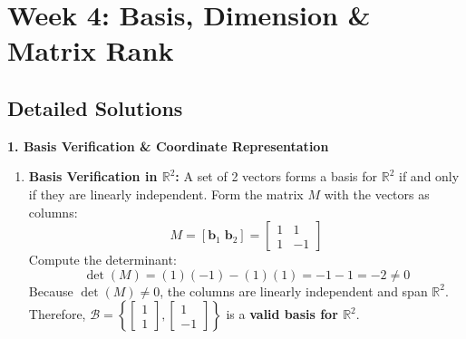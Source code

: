 \section*{Week 4: Basis, Dimension \& Matrix Rank}

\subsection*{Detailed Solutions}

\textbf{1. Basis Verification \& Coordinate Representation}
\begin{enumerate}
    \item \textbf{Basis Verification in $\mathbb{R}^2$:}
    A set of 2 vectors forms a basis for $\mathbb{R}^2$ if and only if they are linearly independent. Form the matrix $M$ with the vectors as columns:
    \begin{equation*}
    M = [\mathbf{b}_1 \; \mathbf{b}_2] = \begin{bmatrix} 1 & 1 \\ 1 & -1 \end{bmatrix}
    \end{equation*}
    Compute the determinant:
    \begin{equation*}
    \det(M) = (1)(-1) - (1)(1) = -1 - 1 = -2 \neq 0
    \end{equation*}
    Because $\det(M) \neq 0$, the columns are linearly independent and span $\mathbb{R}^2$. Therefore, $\mathcal{B} = \left\{ \begin{bmatrix} 1 \\ 1 \end{bmatrix}, \begin{bmatrix} 1 \\ -1 \end{bmatrix} \right\}$ is a \textbf{valid basis for $\mathbb{R}^2$}.
    

\end{enumerate}
